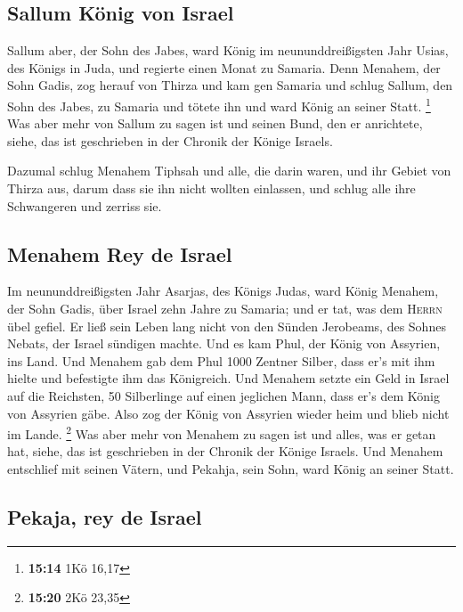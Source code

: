 \hypertarget{sallum-kuxf6nig-von-israel}{%
\subsection{Sallum König von Israel}\label{sallum-kuxf6nig-von-israel}}

 Sallum aber, der Sohn des Jabes, ward König im
neununddreißigsten Jahr Usias, des Königs in Juda, und regierte einen
Monat zu Samaria.  Denn Menahem, der Sohn Gadis, zog
herauf von Thirza und kam gen Samaria und schlug Sallum, den Sohn des
Jabes, zu Samaria und tötete ihn und ward König an seiner Statt.
\footnote{\textbf{15:14} 1Kö 16,17}  Was aber mehr von
Sallum zu sagen ist und seinen Bund, den er anrichtete, siehe, das ist
geschrieben in der Chronik der Könige Israels.

 Dazumal schlug Menahem Tiphsah und alle, die darin
waren, und ihr Gebiet von Thirza aus, darum dass sie ihn nicht wollten
einlassen, und schlug alle ihre Schwangeren und zerriss sie.

\hypertarget{menahem-rey-de-israel}{%
\subsection{Menahem Rey de Israel}\label{menahem-rey-de-israel}}

 Im neununddreißigsten Jahr Asarjas, des Königs Judas,
ward König Menahem, der Sohn Gadis, über Israel zehn Jahre zu Samaria;
 und er tat, was dem \textsc{Herrn} übel gefiel. Er ließ
sein Leben lang nicht von den Sünden Jerobeams, des Sohnes Nebats, der
Israel sündigen machte.  Und es kam Phul, der König von
Assyrien, ins Land. Und Menahem gab dem Phul 1000 Zentner Silber, dass
er's mit ihm hielte und befestigte ihm das Königreich. 
Und Menahem setzte ein Geld in Israel auf die Reichsten, 50 Silberlinge
auf einen jeglichen Mann, dass er's dem König von Assyrien gäbe. Also
zog der König von Assyrien wieder heim und blieb nicht im Lande.
\footnote{\textbf{15:20} 2Kö 23,35}  Was aber mehr von
Menahem zu sagen ist und alles, was er getan hat, siehe, das ist
geschrieben in der Chronik der Könige Israels.  Und
Menahem entschlief mit seinen Vätern, und Pekahja, sein Sohn, ward König
an seiner Statt.

\hypertarget{pekaja-rey-de-israel}{%
\subsection{Pekaja, rey de Israel}\label{pekaja-rey-de-israel}}

